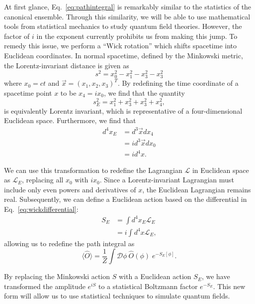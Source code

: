 \documentclass[12pt]{report}
\begin{document}
At first glance, Eq.~\ref{eq:pathintegral} is remarkably similar to the statistics of the canonical ensemble. Through this similarity, we will be able to use mathematical tools from statistical mechanics to study quantum field theories. However, the factor of $i$ in the exponent currently prohibits us from making this jump. To remedy this issue, we perform a ``Wick rotation'' which shifts spacetime into Euclidean coordinates. In normal spacetime, defined by the Minkowski metric, the Lorentz-invariant distance is given as
\begin{equation}
    s^2 = x^2_0 - x^2_1- x^2_3- x^2_3
\end{equation}
where $x_0=ct$ and $\vec{x} = (x_1, x_2, x_3)^T$. By redefining the time coordinate of a spacetime point $x$ to be $x_4=ix_0$, we find that the quantity
\begin{equation}
    s_E^2 = x^2_1+ x^2_3+ x^2_3 + x^2_4,
\end{equation}
is equivalently Lorentz invariant, which is representative of a four-dimensional Euclidean space. Furthermore, we find that
\begin{align}
    d^4x_E &= d^3\vec{x}dx_4 \\
    &= i d^3\vec{x}dx_0 \\
    &= i d^4x. \label{eq:wickdifferential}
\end{align}

We can use this transformation to redefine the Lagrangian $\mathcal{L}$ in Euclidean space as $\mathcal{L}_E$, replacing all $x_0$ with $ix_0$. Since a Lorentz-invariant Lagrangian must include only even powers and derivatives of $x$, the Euclidean Lagrangian remains real. Subsequently, we can define a Euclidean action based on the differential in Eq.~\ref{eq:wickdifferential}:
\begin{align}
    S_E &= \int d^4x_E \mathcal{L}_E \\
    &= i \int d^4x \mathcal{L}_E,
\end{align}
allowing us to redefine the path integral as 
\begin{equation}
    \label{eq:pathintegraleuclidean}
    \langle \hat O \rangle = \frac{1}{Z} \int \mathcal{D}\phi \: \hat O (\phi)\; e^{-S_E[\phi]}.
\end{equation}

By replacing the Minkowski action $S$ with a Euclidean action $S_E$, we have transformed the amplitude $e^{iS}$ to a statistical Boltzmann factor $e^{-S_E}$. This new form will allow us to use statistical techniques to simulate quantum fields.
\end{document}

